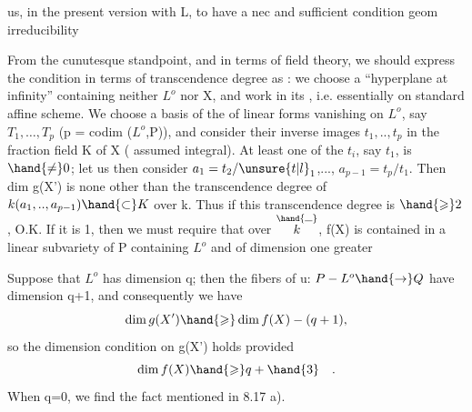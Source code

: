 
us, in the present version with L, to have a nec and sufficient condition
 geom irreducibility 

From the cunutesque standpoint,  and in terms of field
theory, we should express the  condition in terms of
transcendence degree as : we choose a “hyperplane
at infinity” containing neither $L^{o}$ nor X, and work in its ,
i.e. essentially on  standard affine scheme. We choose
a basis of the  of linear forms vanishing on $L^{o}$, 
 say $T_{1},\ldots,T_{p}$ (p = codim ($L^{o}$,P)), and consider
their inverse images $t_{1},..,t_{p}$ in the fraction field K of X
( assumed integral). At least one of the $t_{i}$, say $t_{1}$, is $\hand{\neq} 0$; let us then
consider $a_{1} = t_{2}/\unsure{t|l}_{1}$,..., $a_{p-1} = t_{p}/t_{1}$. Then dim g(X') is none
other than the transcendence degree of $k(a_{1},..,a_{p-1}) \hand{\subset} K$ over k. Thus
if this transcendence degree is $\hand{\geqslant} 2$, O.K.  If it is 1,
then we must require that over $\overset{\hand{\rule{0.6em}{0.35pt}}}{k}$, f(X) is contained in a linear
subvariety of P containing $L^{o}$ and of dimension one greater

Suppose that $L^{o}$ has dimension q; then the fibers of u:
$P - L^{o} \hand{\to} Q$ have dimension q+1,  and consequently we have
\[ \dim g(X') \hand{\geqslant} \dim f(X) - (q+1) , \]
so the dimension condition on g(X') holds provided
\[ \dim f(X) \hand{\geqslant} q+\hand{3} \quad . \]
When q=0, we find the fact mentioned in 8.17 a).  

